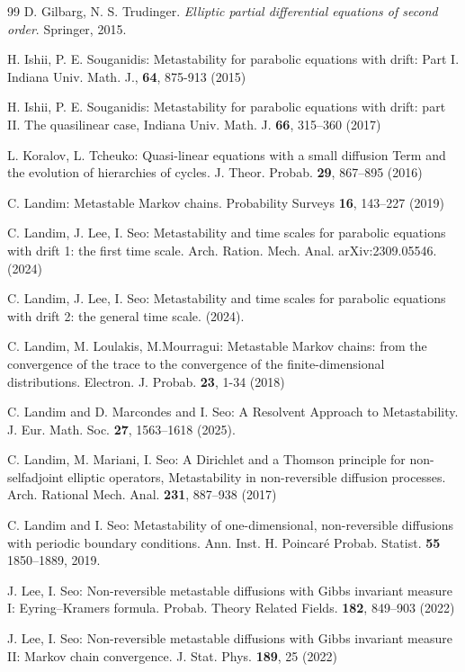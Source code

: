 \documentclass[reqno]{amsart}
\theoremstyle{plain}
\theoremstyle{definition}
\newcounter{as}[section]
\newcommand{\<}{\langle}
\renewcommand{\>}{\rangle}
\begin{document}
\begin{thebibliography}{99}
 D. Gilbarg, N. S. Trudinger. \textsl{Elliptic partial
differential equations of second order}. Springer, 2015.

 H. Ishii, P. E. Souganidis: Metastability for parabolic
equations with drift: Part I. Indiana Univ. Math. J., \textbf{64},
875-913 (2015)

 H. Ishii, P. E. Souganidis: Metastability for parabolic
equations with drift: part II. The quasilinear case, Indiana Univ.
Math. J. \textbf{66}, 315--360 (2017)

 L. Koralov, L. Tcheuko: Quasi-linear equations with
a small diffusion Term and the evolution of hierarchies of cycles.
J. Theor. Probab. \textbf{29}, 867--895 (2016)

 C. Landim: Metastable Markov chains. Probability
Surveys \textbf{16}, 143--227 (2019)

 C. Landim, J. Lee, I. Seo: Metastability and time
scales for parabolic equations with drift 1: the first time scale.
Arch. Ration. Mech. Anal. arXiv:2309.05546. (2024)

 C. Landim, J. Lee, I. Seo: Metastability and time
scales for parabolic equations with drift 2: the general time scale.
(2024).

 C. Landim, M. Loulakis, M.Mourragui: Metastable Markov
chains: from the convergence of the trace to the convergence of the
finite-dimensional distributions. Electron. J. Probab. {\bf 23}, 1-34
(2018)

 C. Landim and D. Marcondes and I. Seo: A Resolvent
Approach to Metastability.  J. Eur. Math. Soc. {\bf 27}, 1563--1618
(2025).

 C. Landim, M. Mariani, I. Seo: A Dirichlet and a Thomson
principle for non-selfadjoint elliptic operators, Metastability in
non-reversible diffusion processes. Arch. Rational Mech. Anal. \textbf{231},
887--938 (2017)

 C. Landim and I. Seo: Metastability of one-dimensional,
non-reversible diffusions with periodic boundary
conditions. Ann. Inst. H. Poincaré Probab. Statist. {\bf 55}
1850--1889, 2019.

 J. Lee, I. Seo: Non-reversible metastable diffusions
with Gibbs invariant measure I: Eyring--Kramers formula. Probab.
Theory Related Fields. \textbf{182}, 849--903 (2022)

 J. Lee, I. Seo: Non-reversible metastable diffusions
with Gibbs invariant measure II: Markov chain convergence. J. Stat.
Phys. \textbf{189}, 25 (2022)


\end{thebibliography}
\end{document}
